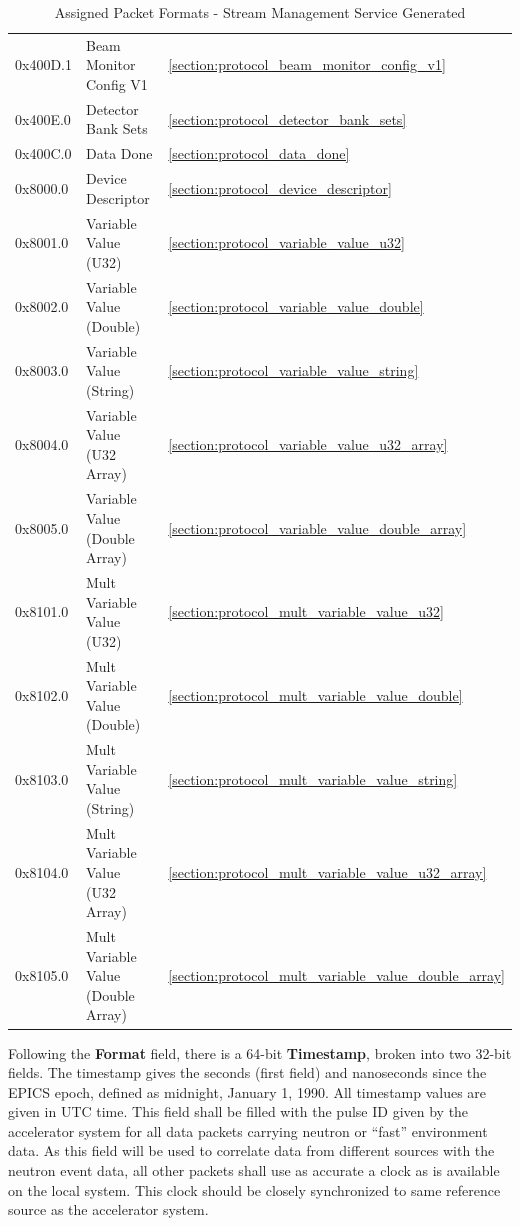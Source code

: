 \begin{table}
\begin{center}
\begin{tabular}{l | l | l}
	0x400D.1 & Beam Monitor Config V1 &
		\ref{section:protocol_beam_monitor_config_v1} \\
	0x400E.0 & Detector Bank Sets &
		\ref{section:protocol_detector_bank_sets} \\
	0x400C.0 & Data Done &
		\ref{section:protocol_data_done} \\
	0x8000.0 & Device Descriptor &
		\ref{section:protocol_device_descriptor} \\
	0x8001.0 & Variable Value (U32) &
		\ref{section:protocol_variable_value_u32} \\
	0x8002.0 & Variable Value (Double) &
		\ref{section:protocol_variable_value_double} \\
	0x8003.0 & Variable Value (String) &
		\ref{section:protocol_variable_value_string} \\
	0x8004.0 & Variable Value (U32 Array) &
		\ref{section:protocol_variable_value_u32_array} \\
	0x8005.0 & Variable Value (Double Array) &
		\ref{section:protocol_variable_value_double_array} \\
	0x8101.0 & Mult Variable Value (U32) &
		\ref{section:protocol_mult_variable_value_u32} \\
	0x8102.0 & Mult Variable Value (Double) &
		\ref{section:protocol_mult_variable_value_double} \\
	0x8103.0 & Mult Variable Value (String) &
		\ref{section:protocol_mult_variable_value_string} \\
	0x8104.0 & Mult Variable Value (U32 Array) &
		\ref{section:protocol_mult_variable_value_u32_array} \\
	0x8105.0 & Mult Variable Value (Double Array) &
		\ref{section:protocol_mult_variable_value_double_array} \\
    \end{tabular}
  \end{center}
  \caption {Assigned Packet Formats - Stream Management Service Generated}
  \label{table:protocol_format_table_stream}
\end{table}

Following the {\bf Format} field, there is a 64-bit {\bf Timestamp}, broken
into two 32-bit fields. The timestamp gives the seconds (first field) and
nanoseconds since the EPICS epoch, defined as midnight, January 1, 1990.  All
timestamp values are given in UTC time.  This field shall be filled with the
pulse ID given by the accelerator system for all data packets carrying neutron
or ``fast'' environment data. As this field will be used to correlate data from
different sources with the neutron event data, all other packets shall use as
accurate a clock as is available on the local system. This clock should be
closely synchronized to same reference source as the accelerator system.

